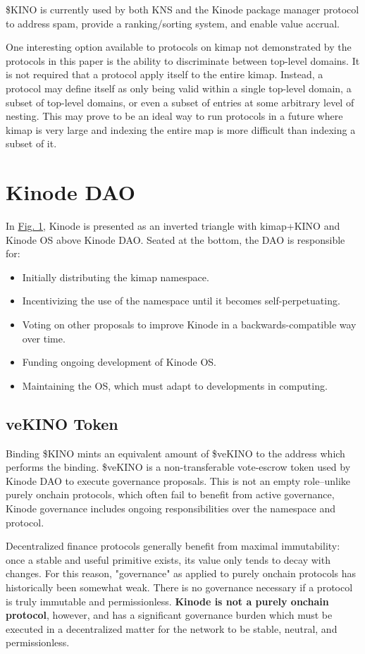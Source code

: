 \documentclass[runningheads]{llncs}
\begin{document}
\$KINO is currently used by both KNS and the Kinode package manager protocol to address spam, provide a ranking/sorting system, and enable value accrual.

One interesting option available to protocols on kimap not demonstrated by the protocols in this paper is the ability to discriminate between top-level domains.
It is not required that a protocol apply itself to the entire kimap.
Instead, a protocol may define itself as only being valid within a single top-level domain, a subset of top-level domains, or even a subset of entries at some arbitrary level of nesting.
This may prove to be an ideal way to run protocols in a future where kimap is very large and indexing the entire map is more difficult than indexing a subset of it.

\section{Kinode DAO}

In \hyperref[fig:triangle]{Fig. 1}, Kinode is presented as an inverted triangle with kimap+KINO and Kinode OS above Kinode DAO.
Seated at the bottom, the DAO is responsible for:
\begin{itemize}
    \item Initially distributing the kimap namespace.
    \item Incentivizing the use of the namespace until it becomes self-perpetuating.
    \item Voting on other proposals to improve Kinode in a backwards-compatible way over time.
    \item Funding ongoing development of Kinode OS.
    \item Maintaining the OS, which must adapt to developments in computing.
\end{itemize}

\subsection{veKINO Token}

Binding \$KINO mints an equivalent amount of \$veKINO to the address which performs the binding.
\$veKINO is a non-transferable vote-escrow token used by Kinode DAO to execute governance proposals.
This is not an empty role–unlike purely onchain protocols, which often fail to benefit from active governance, Kinode governance includes ongoing responsibilities over the namespace and protocol.

Decentralized finance protocols generally benefit from maximal immutability: once a stable and useful primitive exists, its value only tends to decay with changes.
For this reason, "governance" as applied to purely onchain protocols has historically been somewhat weak.
There is no governance necessary if a protocol is truly immutable and permissionless. \textbf{Kinode is not a purely onchain protocol}, however, and has a significant governance burden which must be executed in a decentralized matter for the network to be stable, neutral, and permissionless.
\end{document}
